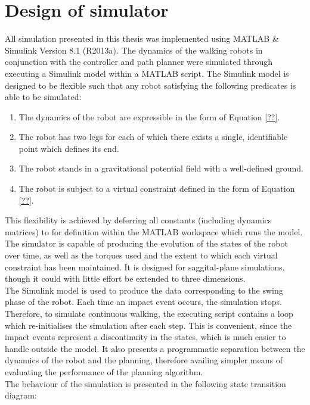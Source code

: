 \section{Design of simulator}
All simulation presented in this thesis was implemented using MATLAB \& Simulink Version 8.1 (R2013a). The dynamics of the walking robots in conjunction with the controller and path planner were simulated through executing a Simulink model within a MATLAB script. The Simulink model is designed to be flexible such that any robot satisfying the following predicates is able to be simulated:
\begin{enumerate}
	\item The dynamics of the robot are expressible in the form of Equation \ref{??}.
	\item The robot has two legs for each of which there exists a single, identifiable point which defines its end.
	\item The robot stands in a gravitational potential field with a well-defined ground.
	\item The robot is subject to a virtual constraint defined in the form of Equation \ref{??}.
\end{enumerate}

This flexibility is achieved by deferring all constants (including dynamics matrices) to for definition within the MATLAB workspace which runs the model. \\

The simulator is capable of producing the evolution of the states of the robot over time, as well as the torques used and the extent to which each virtual constraint has been maintained. It is designed for saggital-plane simulations, though it could with little effort be extended to three dimensions. \\

The Simulink model is used to produce the data corresponding to the swing phase of the robot. Each time an impact event occurs, the simulation stops. Therefore, to simulate continuous walking, the executing script contains a loop which re-initialises the simulation after each step. This is convenient, since the impact events represent a discontinuity in the states, which is much easier to handle outside the model. It also presents a programmatic separation between the dynamics of the robot and the planning, therefore availing simpler means of evaluating the performance of the planning algorithm. \\

The behaviour of the simulation is presented in the following {\color{red}state transition diagram}:

